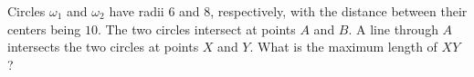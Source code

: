 Circles $\omega_1$ and $\omega_2$ have radii $6$ and $8$, respectively, with the distance between their centers being $10$. The two circles intersect at points $A$ and $B$. A line through $A$ intersects the two circles at points $X$ and $Y$. What is the maximum length of $XY$ ?
